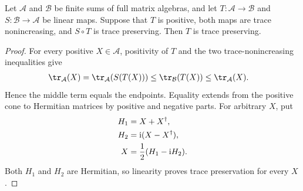 \begin{lemma}
    \label{thm:direct_sum_trace_preservation_sandwich}
    \leanok
    Let $\mathcal A$ and $\mathcal B$ be finite sums of full matrix algebras,
    and let $T:\mathcal A\to\mathcal B$ and $S:\mathcal B\to\mathcal A$ be
    linear maps. Suppose that $T$ is positive, both maps are trace
    nonincreasing, and $S\circ T$ is trace preserving. Then $T$ is trace
    preserving.
\end{lemma}

\begin{proof}\leanok
    For every positive $X\in\mathcal A$, positivity of $T$ and the two
    trace-nonincreasing inequalities give
    \begin{align}
        \tr_{\mathcal A}(X)
         & =\tr_{\mathcal A}(S(T(X)))
        \leq\tr_{\mathcal B}(T(X))
        \leq\tr_{\mathcal A}(X).
        \notag
    \end{align}
    Hence the middle term equals the endpoints. Equality extends from the
    positive cone to Hermitian matrices by positive and negative parts. For
    arbitrary $X$, put
    \begin{align}
        H_1 & =X+X^\dagger,
        \notag                             \\
        H_2 & =\mathrm{i}(X-X^\dagger),
        \notag                             \\
        X   & =\frac12(H_1-\mathrm{i}H_2).
        \notag
    \end{align}
    Both $H_1$ and $H_2$ are Hermitian, so linearity proves trace preservation
    for every $X$.
\end{proof}

